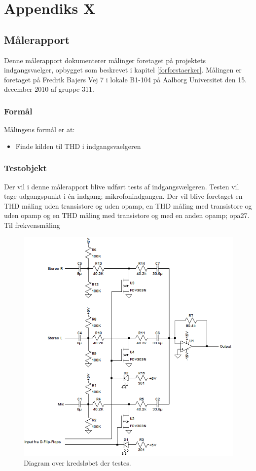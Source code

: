 %
%
\chapter{Appendiks X}
\label{maalejournal_indgangsvaelger_2}
\section*{Målerapport}
Denne målerapport dokumenterer målinger foretaget på projektets indgangsvaelger, opbygget som beskrevet i kapitel \ref{forforstaerker}. Målingen er foretaget på Fredrik Bajers Vej 7 i lokale B1-104 på Aalborg Universitet den 15. december 2010 af gruppe 311.

\subsection*{Formål}
Målingens formål er at:
\begin{itemize}
\item Finde kilden til THD i indgangsvaelgeren
\end{itemize}

\subsection*{Testobjekt}
Der vil i denne målerapport blive udført tests af indgangsvælgeren. Testen vil tage udgangspunkt i én indgang; mikrofonindgangen. Der vil blive foretaget en THD måling uden transistore og uden opamp, en THD måling med transistore og uden opamp og en THD måling med transistore og med en anden opamp; opa27.
Til frekvensmåling 
\begin{figure}[h]
\centering
\includegraphics[scale=0.8]{indgangvaelger_ltspice_diagram.png}
\caption{Diagram over kredsløbet der testes.}
\label{diagram_simulering}
\end{figure}


